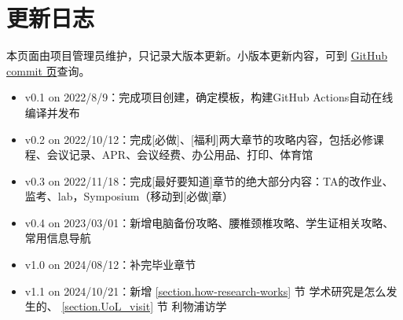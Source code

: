 \chapter{更新日志}

本页面由项目管理员维护，只记录大版本更新。小版本更新内容，可到 \href{https://github.com/xp-pgrs-unofficial-guide/xp_pgrs_unofficial_guide/commits/main}{GitHub commit 页}查询。

\begin{itemize}
    \item v0.1 on 2022/8/9：完成项目创建，确定模板，构建GitHub Actions自动在线编译并发布
    \item v0.2 on 2022/10/12：完成[必做]、[福利]两大章节的攻略内容，包括必修课程、会议记录、APR、会议经费、办公用品、打印、体育馆
    \item v0.3 on 2022/11/18：完成[最好要知道]章节的绝大部分内容：TA的改作业、监考、lab，Symposium（移动到[必做]章）
    \item v0.4 on 2023/03/01：新增电脑备份攻略、腰椎颈椎攻略、学生证相关攻略、常用信息导航
    \item v1.0 on 2024/08/12：补完毕业章节
    \item v1.1 on 2024/10/21：新增 \ref{section.how-research-works} 节 \space 学术研究是怎么发生的、 \ref{section.UoL_visit} 节 \space 利物浦访学
\end{itemize}


